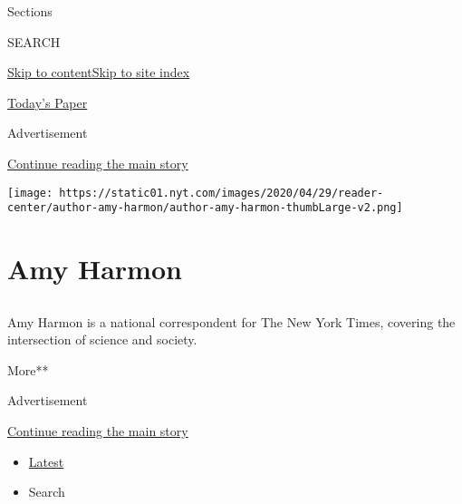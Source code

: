 Sections

SEARCH

\protect\hyperlink{site-content}{Skip to
content}\protect\hyperlink{site-index}{Skip to site index}

\href{https://myaccount.nytimes.com/auth/login?response_type=cookie\&client_id=vi}{}

\href{https://www.nytimes.com/section/todayspaper}{Today's Paper}

Advertisement

\protect\hyperlink{after-top}{Continue reading the main story}

\texttt{[image: https://static01.nyt.com/images/2020/04/29/reader-center/author-amy-harmon/author-amy-harmon-thumbLarge-v2.png]}

\hypertarget{amy-harmon}{%
\section{Amy Harmon}\label{amy-harmon}}

\subsection{}

Amy Harmon is a national correspondent for The New York Times, covering
the intersection of science and society.

More**

Advertisement

\protect\hyperlink{after-mid1}{Continue reading the main story}

\begin{itemize}
\tightlist
\item
  \protect\hyperlink{stream-panel}{Latest}
\item
  Search
\end{itemize}

